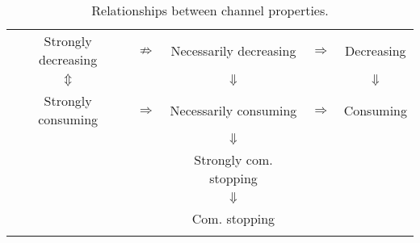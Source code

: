 \begin{table}[ht]
\begin{center}
\begin{tabular}{ccccc}
     \multicolumn{1}{|c|}{{\cellcolor{lightlightblue}}Strongly decreasing}      & $\not\Rightarrow$   &    
        \multicolumn{1}{|c|}{{\cellcolor{lightlightblue}}Necessarily decreasing} & $\Rightarrow$ & 
            \multicolumn{1}{|c|}{{\cellcolor{lightlightblue}}Decreasing}  \\
     

     \multicolumn{1}{|c|}{{\cellcolor{lightlightblue}}$\Updownarrow$}         &   &
        \multicolumn{1}{|c|}{{\cellcolor{lightlightblue}}$\Downarrow$} & & 
            \multicolumn{1}{|c|}{{\cellcolor{lightlightblue}}$\Downarrow$}\\ 
   
     \multicolumn{1}{|c|}{{\cellcolor{lightlightblue}}Strongly consuming}       &  $\Rightarrow$  &    
        \multicolumn{1}{|c|}{{\cellcolor{lightlightblue}}Necessarily consuming} & $\Rightarrow$ & 
            \multicolumn{1}{|c|}{{\cellcolor{lightlightblue}} Consuming}  \\
     

    \hhline{|-|~|-|~|-|}

    &   &  \multicolumn{1}{c}{$\Downarrow$} & & 
            \\ 
    
    \hhline{|~|~|-|~|~|}
            

    &   &   
        \multicolumn{1}{|c|}{{\cellcolor{lightlightblue}}Strongly com. stopping} & & 
            \\


    &   &     
        \multicolumn{1}{|c|}{{\cellcolor{lightlightblue}}$\Downarrow$} & & 
            \\ 

    &   &  
        \multicolumn{1}{|c|}{{\cellcolor{lightlightblue}}Com. stopping} & & 
            \\
    \hhline{|~|~|-|~|~|}              
    \end{tabular}
\vspace{2mm}
\caption{Relationships between channel properties.}\label{tab:intro:prop-rel}
 \end{center}
    
\end{table}